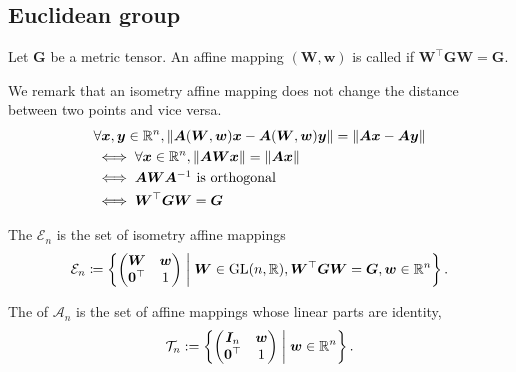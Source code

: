 \subsection{Euclidean group}

\begin{screen}
  \begin{definition}[isometry]
    Let $\bm{G}$ be a metric tensor.
    An affine mapping $(\bm{W}, \bm{w})$ is called  if $\bm{W}^{\top} \bm{G} \bm{W} = \bm{G}$.
  \end{definition}
\end{screen}

We remark that an isometry affine mapping does not change the distance between two points and vice versa.
\begin{align*}
  &\forall \bm{x}, \bm{y} \in \mathbb{R}^{n}, \left\lVert \bm{A} (\bm{W}, \bm{w}) \bm{x} - \bm{A} (\bm{W}, \bm{w}) \bm{y}\right\rVert = \left\lVert\bm{Ax} - \bm{Ay}\right\rVert \\
  &\iff \forall \bm{x} \in \mathbb{R}^{n}, \left\lVert \bm{AW} \bm{x} \right\rVert = \left\lVert\bm{Ax}\right\rVert \\
  &\iff \mbox{$\bm{A} \bm{W} \bm{A}^{-1}$ is orthogonal} \\
  &\iff \bm{W}^{\top} \bm{G} \bm{W} = \bm{G}
\end{align*}

\begin{screen}
  \begin{definition}
    The  $\mathcal{E}_{n}$ is the set of isometry affine mappings
    \begin{align}
      \mathcal{E}_{n} \coloneqq \left\{  \begin{pmatrix} \bm{W} & \bm{w} \\ \bm{0}^{\top} & 1 \end{pmatrix}  \mathrel{}\middle|\mathrel{}  \bm{W} \in \mathrm{GL}(n, \mathbb{R}), \bm{W}^{\top} \bm{GW} = \bm{G}, \bm{w} \in \mathbb{R}^{n}  \right\}.
    \end{align}
  \end{definition}
\end{screen}

\begin{screen}
  \begin{definition}
    The  of $\mathcal{A}_{n}$ is the set of affine mappings whose linear parts are identity,
    \begin{align}
      \mathcal{T}_{n} := \left\{  \begin{pmatrix} \bm{I}_{n} & \bm{w} \\ \bm{0}^{\top} & 1 \end{pmatrix}  \mathrel{}\middle|\mathrel{}  \bm{w} \in \mathbb{R}^{n}  \right\}.
    \end{align}
  \end{definition}
\end{screen}


